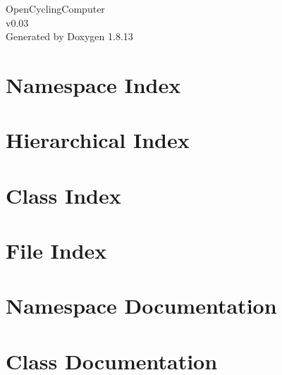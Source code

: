 \documentclass[twoside]{book}
\newcommand{\+}{\discretionary{\mbox{\scriptsize$\hookleftarrow$}}{}{}}
\newcommand{\clearemptydoublepage}{%
  \newpage{\pagestyle{empty}\cleardoublepage}%
}
\begin{document}
\hypersetup{pageanchor=false,
             bookmarksnumbered=true,
             pdfencoding=unicode
            }
\begin{titlepage}
\vspace*{7cm}
\begin{center}%
{\Large Open\+Cycling\+Computer \\[1ex]\large v0.\+03 }\\
\vspace*{1cm}
{\large Generated by Doxygen 1.8.13}\\
\end{center}
\end{titlepage}
\clearemptydoublepage
{}
\tableofcontents
\clearemptydoublepage
{}
\hypersetup{pageanchor=true}

\chapter{Namespace Index}

\chapter{Hierarchical Index}

\chapter{Class Index}

\chapter{File Index}

\chapter{Namespace Documentation}





















\chapter{Class Documentation}



















\end{document}

